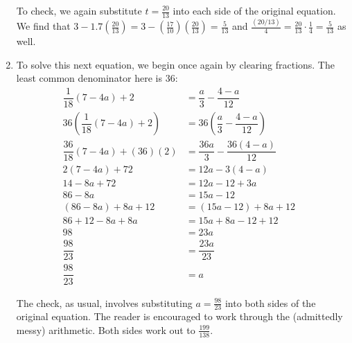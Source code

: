 \begin{ex}
\begin{enumerate}
To check, we again substitute $t = \frac{20}{13}$ into each side of the original equation.  We find that $3 - 1.7 \left(\frac{20}{13}\right) = 3 - \left(\frac{17}{10}\right)\left(\frac{20}{13}\right) =   \frac{5}{13}$ and $\frac{(20/13)}{4} = \frac{20}{13} \cdot \frac{1}{4} = \frac{5}{13}$ as well.

\item  To solve this next equation, we begin once again by clearing fractions.  The least common denominator here is $36$:
\begin{align*}
 \dfrac{1}{18}(7 - 4a) + 2 & = \dfrac{a}{3} - \dfrac{4-a}{12} \\
36 \left(\dfrac{1}{18}(7 - 4a) + 2\right) & = 36 \left(\dfrac{a}{3} - \dfrac{4-a}{12}\right) \tag{Multiply by $36$} \\
\dfrac{36}{18} (7-4a) + (36)(2) & = \dfrac{36a}{3} - \dfrac{36(4-a)}{12} \tag{Distribute} \\
2(7-4a)  + 72 & = 12 a - 3(4-a) \tag{Distribute} \\
14  - 8a + 72 & = 12a - 12 + 3a \\
86 - 8a & = 15 a - 12 \tag{$12 a + 3a = (12+3)a = 15a$} \\
(86-8a)+8a+12 & = (15a-12) + 8a + 12 & \tag{Add $8a$ and $12$} \\
86 + 12 - 8a + 8a & = 15a + 8a - 12 + 12 \tag{Rearrange terms} \\
98 & = 23 a \tag{$15a + 8a = (15+8)a = 23a$} \\
\dfrac{98}{23} & = \dfrac{23a}{23} \tag{Divide by the coefficient of $a$} \\
\dfrac{98}{23} & = a
\end{align*}

The check, as usual, involves substituting $a = \frac{98}{23}$ into both sides of the original equation.  The reader is encouraged to work through the (admittedly messy) arithmetic.  Both sides work out to $\frac{199}{138}$.



\end{enumerate}
\end{ex}
